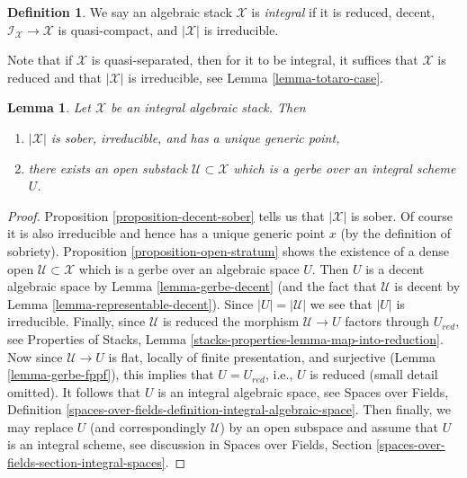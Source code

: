 \documentclass{stacks-project}
\theoremstyle{plain}
\newtheorem{lemma}[subsection]{Lemma}
\theoremstyle{definition}
\newtheorem{definition}[subsection]{Definition}
\theoremstyle{remark}
\numberwithin{equation}{subsection}
\begin{document}
\begin{definition}
\label{definition-integral-algebraic-stack}
We say an algebraic stack $\mathcal{X}$ is
{\it integral} if it is reduced, decent,
$\mathcal{I}_\mathcal{X} \to \mathcal{X}$ is quasi-compact,
and $|\mathcal{X}|$ is irreducible.
\end{definition}

\noindent
Note that if $\mathcal{X}$ is quasi-separated, then
for it to be integral, it suffices that $\mathcal{X}$ is reduced
and that $|\mathcal{X}|$ is irreducible, see Lemma \ref{lemma-totaro-case}.

\begin{lemma}
\label{lemma-structure-integral-stack}
Let $\mathcal{X}$ be an integral algebraic stack. Then
\begin{enumerate}
\item $|\mathcal{X}|$ is sober, irreducible, and has a unique generic point,
\item there exists an open substack $\mathcal{U} \subset \mathcal{X}$ 
which is a gerbe over an integral scheme $U$.
\end{enumerate}
\end{lemma}

\begin{proof}
Proposition \ref{proposition-decent-sober} tells us that $|\mathcal{X}|$
is sober. Of course it is also irreducible and hence has a unique generic
point $x$ (by the definition of sobriety).
Proposition \ref{proposition-open-stratum} shows
the existence of a dense open $\mathcal{U} \subset \mathcal{X}$
which is a gerbe over an algebraic space $U$.
Then $U$ is a decent algebraic space by
Lemma \ref{lemma-gerbe-decent} (and the fact that $\mathcal{U}$
is decent by Lemma \ref{lemma-representable-decent}).
Since $|U| = |\mathcal{U}|$ we see that $|U|$ is irreducible.
Finally, since $\mathcal{U}$ is reduced the morphism
$\mathcal{U} \to U$ factors through $U_{red}$, see
Properties of Stacks, Lemma \ref{stacks-properties-lemma-map-into-reduction}.
Now since $\mathcal{U} \to U$ is flat, locally of finite presentation,
and surjective (Lemma \ref{lemma-gerbe-fppf}), this implies that
$U = U_{red}$, i.e., $U$ is reduced (small detail omitted).
It follows that $U$ is an integral algebraic space, see
Spaces over Fields, Definition
\ref{spaces-over-fields-definition-integral-algebraic-space}.
Then finally, we may replace $U$ (and correspondingly $\mathcal{U}$)
by an open subspace and assume that $U$ is an integral scheme, see
discussion in  Spaces over Fields, Section
\ref{spaces-over-fields-section-integral-spaces}.
\end{proof}
\end{document}
